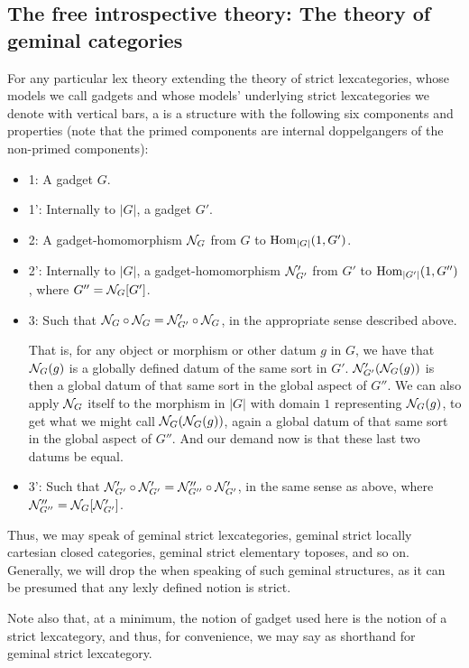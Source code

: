 \documentclass[./main.tex]{subfiles}
\begin{document}
\subsection{The free introspective theory: The theory of geminal categories}
\begin{definition}
For any particular lex theory extending the theory of strict lexcategories, whose models we call gadgets and whose models' underlying strict lexcategories we denote with vertical bars, a  is a structure with the following six components and properties (note that the primed components are internal doppelgangers of the non-primed components):
\begin{itemize}
    \item 1: A gadget $G$.
    \item 1': Internally to $|G|$, a gadget $G'$.
    \item 2: A gadget-homomorphism $\mathcal{N}_G$ from $G$ to $\operatorname{Hom}_{|G|}(1, G')$.
    \item 2': Internally to $|G|$, a gadget-homomorphism $\mathcal{N}'_{G'}$ from $G'$ to $\operatorname{Hom}_{|G'|}(1, G'')$, where $G'' = \mathcal{N}_G[G']$.
    \item 3: Such that $\mathcal{N}_G \circ \mathcal{N}_G = \mathcal{N}'_{G'} \circ \mathcal{N}_G$, in the appropriate sense described above.
    
    That is, for any object or morphism or other datum $g$ in $G$, we have that $\mathcal{N}_G(g)$ is a globally defined datum of the same sort in $G'$. $\mathcal{N}'_{G'} (\mathcal{N}_G(g))$ is then a global datum of that same sort in the global aspect of $G''$. We can also apply $\mathcal{N}_G$ itself to the morphism in $|G|$ with domain $1$ representing $\mathcal{N}_G(g)$, to get what we might call $\mathcal{N}_G (\mathcal{N}_G(g))$, again a global datum of that same sort in the global aspect of $G''$. And our demand now is that these last two datums be equal.
    
    \item 3': Such that $\mathcal{N}'_{G'} \circ \mathcal{N}'_{G'} = \mathcal{N}''_{G''} \circ \mathcal{N}'_{G'}$, in the same sense as above, where $\mathcal{N}''_{G''} = \mathcal{N}_{G}[\mathcal{N}'_{G'}]$.
\end{itemize}
Thus, we may speak of geminal strict lexcategories, geminal strict locally cartesian closed categories, geminal strict elementary toposes, and so on. Generally, we will drop the  when speaking of such geminal structures, as it can be presumed that any lexly defined notion is strict.

Note also that, at a minimum, the notion of gadget used here is the notion of a strict lexcategory, and thus, for convenience, we may say  as shorthand for geminal strict lexcategory.


\end{definition}
\end{document}
